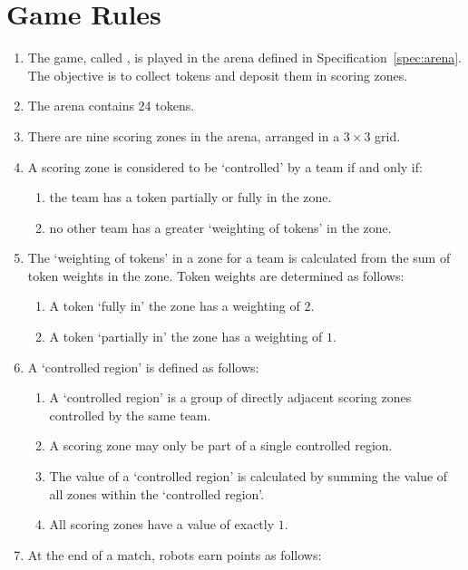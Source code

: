 \section{Game Rules}
\label{sec:rules}

\begin{enumerate}
  \item The game, called \emph{\gamename}, is played in the arena defined in
        Specification~\ref{spec:arena}. The objective is to collect tokens and
        deposit them in scoring zones.
  \item The arena contains 24 tokens.
  \item There are nine scoring zones in the arena, arranged in a $3\times3$
        grid.
  \item A scoring zone is considered to be `controlled' by a team if and only if:
    \begin{enumerate}
      \item the team has a token partially or fully in the zone.
      \item no other team has a greater `weighting of tokens' in the zone.
    \end{enumerate}
  \item The `weighting of tokens' in a zone for a team is calculated from the sum of token weights in the zone.
      Token weights are determined as follows:
      \begin{enumerate}
            \item A token `fully in' the zone has a weighting of $2$.
            \item A token `partially in' the zone has a weighting of $1$.
    \end{enumerate}
  \item A `controlled region' is defined as follows:
    \begin{enumerate}
      \item A `controlled region' is a group of directly adjacent scoring zones controlled by the same team.
      \item A scoring zone may only be part of a single controlled region.
      \item The value of a `controlled region' is calculated by summing the value of all zones within the `controlled region'.
      \item All scoring zones have a value of exactly $1$.
    \end{enumerate}
  \item At the end of a match, robots earn points as follows:
    \begin{enumerate}

\end{enumerate}
\end{enumerate}
